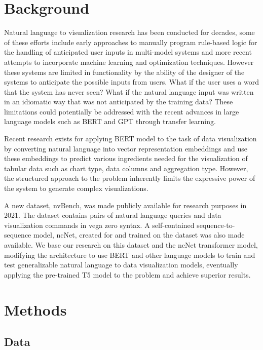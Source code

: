 \documentclass[
	a4paper, %
	10pt, %
	unnumberedsections, %
	twoside, %
]{t0003}
\begin{document}
\section{Background}

Natural language to visualization research has been conducted for decades, some of these efforts include early approaches to manually program rule-based logic for the handling of anticipated user inputs in multi-model systems\cite{Cox:2001qr} and more recent attempts to incorporate machine learning and optimization techniques\cite{Aurisano:2016qr}. However these systems are limited in functionality by the ability of the designer of the systems to anticipate the possible inputs from users. What if the user uses a word that the system has never seen? What if the natural language input was written in an idiomatic way that was not anticipated by the training data? These limitations could potentially be addressed with the recent advances in large language models such as BERT and GPT through transfer learning.

Recent research exists for applying BERT model to the task of data visualization\cite{Can:2021qr} by converting natural language into vector representation embeddings and use these embeddings to predict various ingredients needed for the visualization of tabular data such as chart type, data columns and aggregation type. However, the structured approach to the problem inherently limits the expressive power of the system to generate complex visualizations.

A new dataset, nvBench\cite{Luo:2021qr}, was made publicly available for research purposes in 2021. The dataset contains pairs of natural language queries and data visualization commands in vega zero syntax\cite{Luo:2022qr}. A self-contained sequence-to-sequence model, ncNet\cite{Luo:2022qr}, created for and trained on the dataset was also made available. We base our research on this dataset and the ncNet transformer model, modifying the architecture to use BERT and other language models to train and test generalizable natural language to data visualization models, eventually applying the pre-trained T5 model to the problem and achieve superior results.

\section{Methods}

\subsection{Data}
\end{document}
